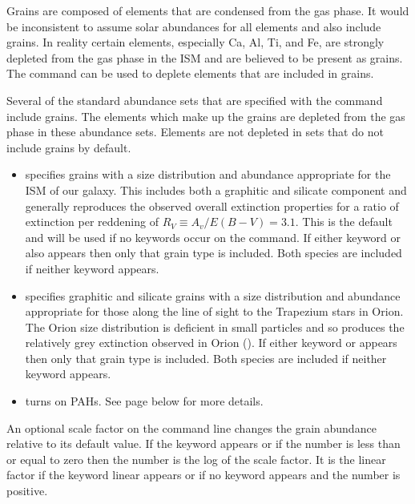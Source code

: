Grains are composed of elements that are condensed from the gas phase.
It would be inconsistent to assume solar abundances for all elements and
also include grains.
In reality certain elements, especially Ca, Al, Ti,
and Fe, are strongly depleted from the gas phase in the ISM
and are believed to be present as grains.
The  command can be used
to deplete elements that are included in grains.

Several of the standard abundance sets that are specified with the
 command include grains.
The elements which make
up the grains are depleted from the gas phase in these abundance sets.
Elements are not depleted in sets that do not include grains by default.

\begin{itemize}
\item {}  specifies grains
with a size distribution
and abundance appropriate for the ISM of our galaxy.
This includes both a graphitic and
silicate component and generally reproduces the observed overall
extinction
properties for a ratio of extinction per reddening of
$R_V \equiv A_v/E(B-V) = 3.1$.
This is the default and will be used if no keywords occur on the
 command.
If either keyword  or  also
appears then only that grain type is included.
Both species are included if neither keyword appears.

\item {}
specifies graphitic and silicate grains with a size distribution and
abundance appropriate for those along the line of sight to the Trapezium
stars in Orion.
The Orion size distribution is deficient in small particles
and so produces the relatively grey extinction observed in
Orion (\citealp{Baldwin1991}).
If either keyword  or  appears
then only that grain type is included.
Both species are included if neither keyword appears.

\item {} turns on PAHs.
See page \pageref{sec:GrainPAHcommands} below for more details.
\end{itemize}

  An optional scale factor
on the command line changes
the grain abundance relative to its default value.
If the keyword 
appears or if the number is less than or equal to zero
then the number is the log of the scale factor.
It is the linear factor if the keyword linear
appears or if no keyword appears and the number is positive.

